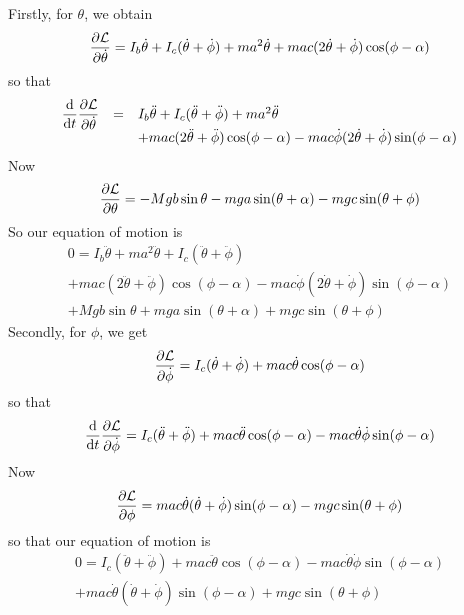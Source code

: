 \documentclass{article}
\begin{document}
Firstly, for $\theta$, we obtain
\begin{equation}
\frac{\partial \cal{L}}{\partial \dot{\theta}} = I_b \dot{\theta} + I_c (\dot{\theta} + \dot{\phi})
+ ma^2 \dot{\theta} 
   + mac (2\dot{\theta} + \dot{\phi}) \cos(\phi-\alpha)
\end{equation}
so that
\begin{equation}
\begin{array}{rcl}
\displaystyle \frac{\mathrm{d} }{\mathrm{d} t} \frac{\partial \cal{L}}{\partial \dot{\theta}} &=& I_b \ddot{\theta} + I_c (\ddot{\theta} + \ddot{\phi})
+ ma^2 \ddot{\theta} \\
& & + mac(2 \ddot{\theta} + \ddot{\phi})
\cos(\phi-\alpha) - mac \dot{\phi}(2\dot{\theta} + \dot{\phi}) \sin(\phi - \alpha)
\end{array}
\end{equation}
Now 
\begin{equation}
\frac{\partial \cal{L}}{\partial \theta} = 
- Mgb\sin{\theta} - mga \sin(\theta + \alpha) - mgc \sin(\theta + \phi)
\end{equation}
So our equation of motion is
\begin{equation}
\begin{array}{c}
0 = I_b \ddot{\theta} + ma^2 \ddot{\theta} 
+ I_c (\ddot{\theta} + \ddot{\phi}) \\
+ mac(2 \ddot{\theta} + \ddot{\phi}) \cos(\phi-\alpha)
- mac\dot{\phi}(2\dot{\theta} + \dot{\phi}) \sin(\phi - \alpha) \\
+ Mgb\sin{\theta}
+ mga \sin(\theta + \alpha)
+ mgc \sin(\theta + \phi)
\end{array}
\label{eq:motion1}
\end{equation}
Secondly, for $\phi$, we get
\begin{equation}
\frac{\partial \cal{L}}{\partial \dot{\phi}} = I_c (\dot{\theta} + \dot{\phi}) + mac \dot{\theta} \cos(\phi - \alpha)
\end{equation}
so that
\begin{equation}
\frac{\mathrm{d} }{\mathrm{d} t} \frac{\partial \cal{L}}{\partial \dot{\phi}} = I_c (\ddot{\theta} + \ddot{\phi})
+ mac \ddot{\theta} \cos(\phi - \alpha) - mac \dot{\theta}\dot{\phi} \sin(\phi - \alpha)
\end{equation}
Now
\begin{equation}
\frac{\partial \cal{L}}{\partial \phi} = mac \dot{\theta}(\dot{\theta}+\dot{\phi})\sin(\phi - \alpha) 
-mgc \sin(\theta + \phi)
\end{equation}
so that our equation of motion is
\begin{equation}
\begin{array}{c}
0 = I_c (\ddot{\theta} + \ddot{\phi})
+ mac \ddot{\theta} \cos(\phi - \alpha) 
- mac \dot{\theta} \dot{\phi} \sin(\phi - \alpha) \\
+ mac \dot{\theta}(\dot{\theta}+\dot{\phi})\sin(\phi - \alpha) 
+ mgc \sin(\theta + \phi)
\end{array}
\end{equation}
\end{document}
